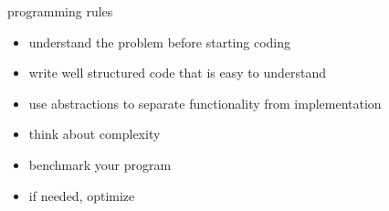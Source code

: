 \begin{frame}{programming rules}

\begin{itemize}
\pause
\item understand the problem before starting coding
\pause
\item write well structured code that is easy to understand
\pause
\item use abstractions to separate functionality from implementation
\pause
\item think about complexity
\pause
\item benchmark your program 
\pause
\item if needed, optimize
\end{itemize}

\end{frame}





